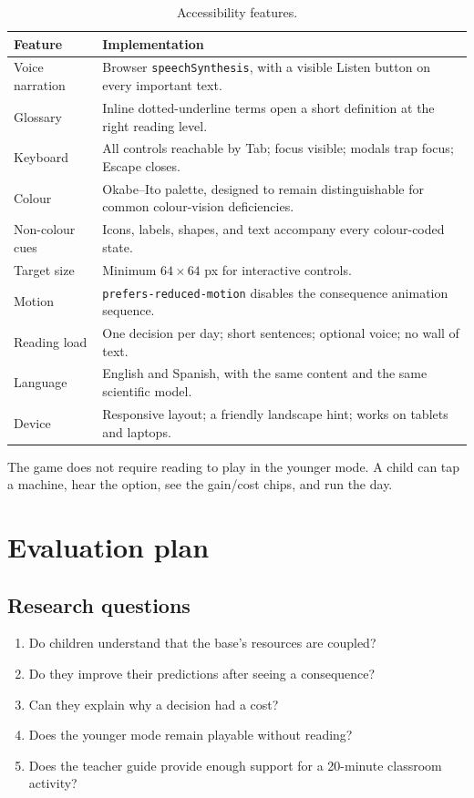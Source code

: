 \documentclass[11pt,a4paper]{article}
\newcommand{\code}[1]{\texttt{#1}}
\begin{document}
\begin{table}[H]
\centering
\small
\begin{tabular}{@{}p{3.6cm}p{10.8cm}@{}}
\toprule
\textbf{Feature} & \textbf{Implementation}\\
\midrule
Voice narration & Browser \code{speechSynthesis}, with a visible Listen button on every important text.\\
Glossary & Inline dotted-underline terms open a short definition at the right reading level.\\
Keyboard & All controls reachable by Tab; focus visible; modals trap focus; Escape closes.\\
Colour & Okabe--Ito palette, designed to remain distinguishable for common colour-vision deficiencies.\\
Non-colour cues & Icons, labels, shapes, and text accompany every colour-coded state.\\
Target size & Minimum $64 \times 64$ px for interactive controls.\\
Motion & \code{prefers-reduced-motion} disables the consequence animation sequence.\\
Reading load & One decision per day; short sentences; optional voice; no wall of text.\\
Language & English and Spanish, with the same content and the same scientific model.\\
Device & Responsive layout; a friendly landscape hint; works on tablets and laptops.\\
\bottomrule
\end{tabular}
\caption{Accessibility features.}
\label{tab:accessibility}
\end{table}

The game does not require reading to play in the younger mode. A child can tap a machine, hear the option, see the gain/cost chips, and run the day.

\section{Evaluation plan}

\subsection{Research questions}

\begin{enumerate}
  \item Do children understand that the base's resources are coupled?
  \item Do they improve their predictions after seeing a consequence?
  \item Can they explain why a decision had a cost?
  \item Does the younger mode remain playable without reading?
  \item Does the teacher guide provide enough support for a 20-minute classroom activity?
\end{enumerate}
\end{document}
